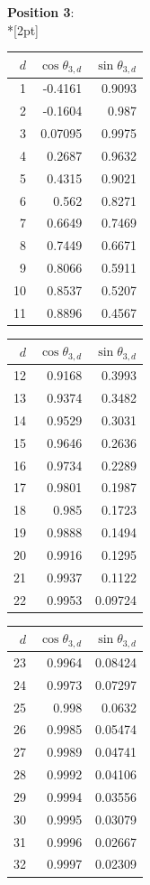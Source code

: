 \noindent \textbf{Position 3}:\\*[2pt]
{\tablefont \begin{tabular}[t]{r|rr}
$d$ & $\cos\theta_{3,d}$ & $\sin\theta_{3,d}$ \\\hline
1 & -0.4161 & 0.9093 \\
2 & -0.1604 & 0.987 \\
3 & 0.07095 & 0.9975 \\
4 & 0.2687 & 0.9632 \\
5 & 0.4315 & 0.9021 \\
6 & 0.562 & 0.8271 \\
7 & 0.6649 & 0.7469 \\
8 & 0.7449 & 0.6671 \\
9 & 0.8066 & 0.5911 \\
10 & 0.8537 & 0.5207 \\
11 & 0.8896 & 0.4567
\end{tabular}\kern4pt
\begin{tabular}[t]{r|rr}
$d$ & $\cos\theta_{3,d}$ & $\sin\theta_{3,d}$ \\\hline
12 & 0.9168 & 0.3993 \\
13 & 0.9374 & 0.3482 \\
14 & 0.9529 & 0.3031 \\
15 & 0.9646 & 0.2636 \\
16 & 0.9734 & 0.2289 \\
17 & 0.9801 & 0.1987 \\
18 & 0.985 & 0.1723 \\
19 & 0.9888 & 0.1494 \\
20 & 0.9916 & 0.1295 \\
21 & 0.9937 & 0.1122 \\
22 & 0.9953 & 0.09724
\end{tabular}\kern4pt
\begin{tabular}[t]{r|rr}
$d$ & $\cos\theta_{3,d}$ & $\sin\theta_{3,d}$ \\\hline
23 & 0.9964 & 0.08424 \\
24 & 0.9973 & 0.07297 \\
25 & 0.998 & 0.0632 \\
26 & 0.9985 & 0.05474 \\
27 & 0.9989 & 0.04741 \\
28 & 0.9992 & 0.04106 \\
29 & 0.9994 & 0.03556 \\
30 & 0.9995 & 0.03079 \\
31 & 0.9996 & 0.02667 \\
32 & 0.9997 & 0.02309 \\

\end{tabular}}
